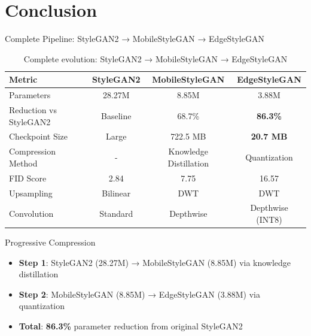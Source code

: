 \documentclass[aspectratio=169,xcolor=dvipsnames]{beamer}
\begin{document}
\section{Conclusion}

\begin{frame}{Complete Pipeline: StyleGAN2 → MobileStyleGAN → EdgeStyleGAN}
    \begin{table}
        \centering
        \footnotesize
        \begin{tabular}{l c c c}
            \toprule
            \textbf{Metric} & \textbf{StyleGAN2} & \textbf{MobileStyleGAN} & \textbf{EdgeStyleGAN} \\
            \midrule
            Parameters & 28.27M & 8.85M & 3.88M \\
            Reduction vs StyleGAN2 & Baseline & 68.7\% & \textbf{86.3\%} \\
            Checkpoint Size & Large & 722.5 MB & \textbf{20.7 MB} \\
            Compression Method & - & Knowledge Distillation & Quantization \\
            FID Score & 2.84 & 7.75 & 16.57 \\
            Upsampling & Bilinear & DWT & DWT \\
            Convolution & Standard & Depthwise & Depthwise (INT8) \\
            \bottomrule
        \end{tabular}
        \caption{Complete evolution: StyleGAN2 → MobileStyleGAN → EdgeStyleGAN}
    \end{table}
    
    \vspace{0.3cm}
    
    \begin{block}{Progressive Compression}
        \begin{itemize}
            \item \textbf{Step 1}: StyleGAN2 (28.27M) → MobileStyleGAN (8.85M) via knowledge distillation
            \item \textbf{Step 2}: MobileStyleGAN (8.85M) → EdgeStyleGAN (3.88M) via quantization
            \item \textbf{Total}: \textbf{86.3\%} parameter reduction from original StyleGAN2
        \end{itemize}
    \end{block}
\end{frame}
\end{document}
